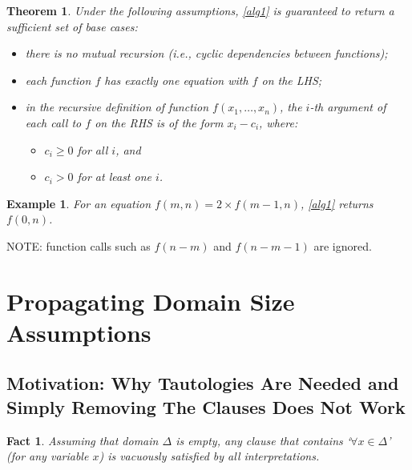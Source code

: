 \documentclass{article}
\newtheorem{example}{Example}
\newtheorem{theorem}{Theorem}
\newtheorem{fact}{Fact}
\begin{document}
\begin{theorem}
  Under the following assumptions, \cref{alg1} is guaranteed to return a
  sufficient set of base cases:
  \begin{itemize}
    \item there is no mutual recursion (i.e., cyclic dependencies between
          functions);
    \item each function $f$ has exactly one equation with $f$ on the LHS;
    \item in the recursive definition of function $f(x_{1},\dots,x_{n})$, the
          $i$-th argument of each call to $f$ on the RHS is of the form
          $x_{i} - c_{i}$, where:
          \begin{itemize}
            \item $c_{i} \ge 0$ for all $i$, and
            \item $c_{i} > 0$ for at least one $i$.
          \end{itemize}
  \end{itemize}
\end{theorem}

\begin{example}
  For an equation $f(m, n) = 2 \times f(m-1, n)$, \cref{alg1} returns $f(0, n)$.
\end{example}

NOTE: function calls such as $f(n-m)$ and $f(n-m-1)$ are ignored.

\section{Propagating Domain Size Assumptions}\label{sec:simplifying}

\subsection{Motivation: Why Tautologies Are Needed and Simply Removing The
  Clauses Does Not Work}

\begin{fact}
  Assuming that domain $\Delta$ is empty, any clause that contains
  `$\forall x \in \Delta$' (for any variable $x$) is vacuously satisfied by all
  interpretations.
\end{fact}
\end{document}
